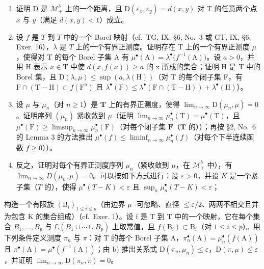 \begin{enumerate}
\def\labelenumi{\alph{enumi})}
\item
  证明 D 是 \(\mathcal{M}_+^b\) 上的一个距离，且 \(\mathrm{D}(\varepsilon_x,\varepsilon_y) = d(x,y)\) 对 T 的任意两个点 \(x\) 与 \(y\)（满足 \(d(x,y) < 1\)）成立。
\item
  设 \(f\) 是 \(T\) 到 \(T\) 中的一个 Borel 映射（cf.~TG, IX, §6, No.~3 或 GT, IX, §6, Exer. 16），\(\lambda\) 是 \(T\) 上的一个有界正测度。证明存在 T 上的一个有界正测度 \(\mu\)，使得对 T 的每个 Borel 子集 A 有 \(\mu^{\bullet}(\mathrm{A}) = \lambda^{\bullet}\big(f^{-1}(\mathrm{A})\big)\)。设 \(a > 0\)，并用 H 表示 \(x \in \mathrm{T}\) 中使 \(d(x, f(x)) \geqslant a\) 的 x 所成的集合；证明 H 是 T 中的 Borel 集，且 \(\mathrm{D}(\lambda, \mu) \leqslant \sup (a, \lambda(\mathrm{H}))\)（对 T 的每个闭子集 F，有 \(\mathrm{F} \cap (\mathrm{T} - \mathrm{H}) \subset f(\mathrm{F}^a)\) 且 \(\lambda^{\bullet}(\mathrm{F}) \leqslant \lambda^{\bullet}(\mathrm{F} \cap (\mathrm{T} - \mathrm{H})) + \lambda^{\bullet}(\mathrm{H})\)）。
\item
  设 \(\mu\) 与 \(\mu_n\)（对 \(n \geqslant 1\)）是 \(\mathbf{T}\) 上的有界正测度，使得 \(\lim_{n \to \infty} \mathrm{D}(\mu_n, \mu) = 0\)。证明序列 \((\mu_n)\) 紧收敛到 \(\mu\)（证明 \(\lim_{n \to \infty} \mu_n^\bullet(\mathrm{T}) = \mu^\bullet(\mathrm{T})\)，且 \(\mu^\bullet(\mathrm{F}) \geqslant \limsup_{n \to \infty} \mu_n^\bullet(\mathrm{F})\)（对每个闭子集 \(\mathbf{F}\)（\(\mathbf{T}\) 的））；再按 §2, No.~6 的 Lemma 3 的方法推出 \(\mu^\bullet(f) \leqslant \liminf_{n \to \infty} \mu_n^\bullet(f)\)（对每个下半连续函数 \(f \geqslant 0\)））。
\item
  反之，证明对每个有界正测度序列 \(\mu_n\)（紧收敛到 \(\mu\)，在 \(\mathcal{M}_+^b\) 中），有 \(\lim_{n \to \infty} D(\mu_n, \mu) = 0\)。可以按如下方式进行：设 \(\varepsilon > 0\)，并设 \(K\) 是一个紧子集（\(T\) 的），使得 \(\mu^\bullet(T - K) < \varepsilon\) 且 \(\sup_{n} \mu_n^\bullet(T - K) < \varepsilon\)；
\end{enumerate}

构造一个有限族 \((\mathrm{B}_{i})_{1\leqslant i\leqslant p}\)（由边界 \(\mu\) -可忽略、直径 \(\leqslant\varepsilon/2\)、两两不相交且并为包含 K 的集合组成）（cf.~Exer. 1）。设 f 是 T 到 T 中的一个映射，它在每个集合 \(B_{1},\ldots,B_{p}\) 与 \(\mathbb{C}(B_{1}\cup\cdots\cup B_{p})\) 上取常值，且 \(f(\mathrm{B}_i) \subset \mathrm{B}_i\)（对 \(1 \leqslant i \leqslant p\)）。用下列条件定义测度 \(\pi_n\) 与 \(\pi\)：对 T 的每个 Borel 子集 A，\(\pi_n^\bullet(\mathrm{A}) = \mu_n^\bullet(\overline{f}(\mathrm{A}))\) 且 \(\pi^\bullet(\mathrm{A}) = \mu^\bullet(f^{-1}(\mathrm{A}))\)；由 b) 推出关系式 \(\mathrm{D}(\pi_n, \mu_n) \leqslant \varepsilon\)，\(\mathrm{D}(\pi, \mu) \leqslant \varepsilon\)，并证明 \(\lim_{n \to \infty} \mathrm{D}(\pi_n, \pi) = 0\)。

